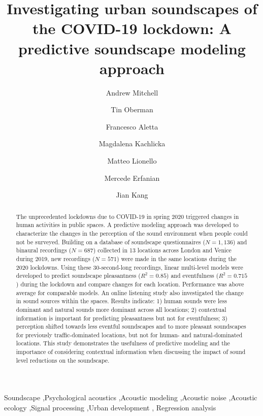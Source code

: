\documentclass[
  authoryear,
  preprint,
  3p,
  onecolumn]{elsarticle}
\begin{document}
\begin{frontmatter}
\title{Investigating urban soundscapes of the COVID-19 lockdown: A
predictive soundscape modeling approach}
\author[1]{Andrew Mitchell%
%
}
\author[1]{Tin Oberman%
%
}
\author[1]{Francesco Aletta%
%
}
\author[1]{Magdalena Kachlicka%
%
}

\author[1]{Matteo Lionello%
%
}

\author[1]{Mercede Erfanian%
%
}

\author[1]{Jian Kang%
%
}









        
\begin{abstract}
The unprecedented lockdowns due to COVID-19 in spring 2020 triggered
changes in human activities in public spaces. A predictive modeling
approach was developed to characterize the changes in the perception of
the sound environment when people could not be surveyed. Building on a
database of soundscape questionnaires (\(N=1,136\)) and binaural
recordings (\(N=687\)) collected in 13 locations across London and
Venice during 2019, new recordings (\(N=571\)) were made in the same
locations during the 2020 lockdowns. Using these 30-second-long
recordings, linear multi-level models were developed to predict
soundscape pleasantness (\(R^2=0.85\)) and eventfulness (\(R^2=0.715\))
during the lockdown and compare changes for each location. Performance
was above average for comparable models. An online listening study also
investigated the change in sound sources within the spaces. Results
indicate: 1) human sounds were less dominant and natural sounds more
dominant across all locations; 2) contextual information is important
for predicting pleasantness but not for eventfulness; 3) perception
shifted towards less eventful soundscapes and to more pleasant
soundscapes for previously traffic-dominated locations, but not for
human- and natural-dominated locations. This study demonstrates the
usefulness of predictive modeling and the importance of considering
contextual information when discussing the impact of sound level
reductions on the soundscape.
\end{abstract}





\begin{keyword}
    Soundscape \sep Psychological acoustics \sep Acoustic
modeling \sep Acoustic noise \sep Acoustic ecology \sep Signal
processing \sep Urban development \sep 
    Regression analysis
\end{keyword}
\end{frontmatter}
    
\end{document}
